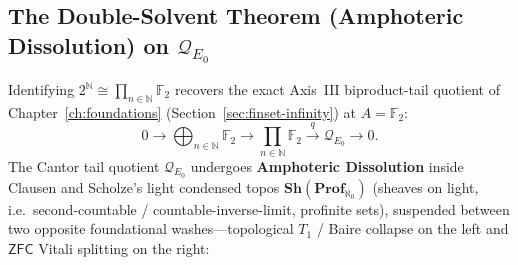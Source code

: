 \subsection{The Double-Solvent Theorem (Amphoteric Dissolution) on $\mathcal{Q}_{E_0}$}

Identifying $2^{\mathbb{N}} \cong \prod_{n \in \mathbb{N}} \mathbb{F}_2$ recovers the exact Axis~III biproduct-tail quotient of Chapter~\ref{ch:foundations} (Section~\ref{sec:finset-infinity}) at $A = \mathbb{F}_2$:
\[
  0 \longrightarrow \bigoplus_{n \in \mathbb{N}} \mathbb{F}_2 \longrightarrow \prod_{n \in \mathbb{N}} \mathbb{F}_2 \xrightarrow{\;q\;} \mathcal{Q}_{E_0} \longrightarrow 0.
\]
The Cantor tail quotient $\mathcal{Q}_{E_0}$ undergoes \textbf{Amphoteric Dissolution} inside Clausen and Scholze's light condensed topos $\mathbf{Sh}(\mathbf{Prof}_{\aleph_0})$ (sheaves on light, i.e.\ second-countable / countable-inverse-limit, profinite sets), suspended between two opposite foundational washes---topological $T_1$ / Baire collapse on the left and $\mathsf{ZFC}$ Vitali splitting on the right:

